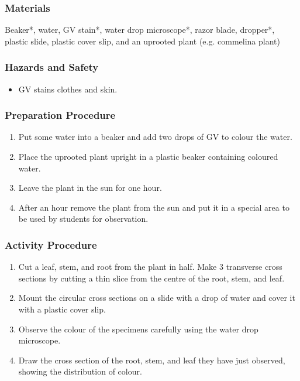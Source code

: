 \subsubsection*{Materials}
Beaker*, water, GV stain*, water drop microscope*, razor blade, dropper*, plastic slide, plastic cover slip, and an uprooted plant (e.g. commelina plant)

\subsubsection*{Hazards and Safety}
\begin{itemize}
\item{GV stains clothes and skin.}
\end{itemize}

\subsubsection*{Preparation Procedure}
\begin{enumerate}
\item{Put some water into a beaker and add two drops of GV to colour the water.}
\item{Place the uprooted plant upright in a plastic beaker containing coloured water.}
\item{Leave the plant in the sun for one hour.}
\item{After an hour remove the plant from the sun and put it in a special area to be used by students for observation.}
\end{enumerate}

\subsubsection*{Activity Procedure}
\begin{enumerate}
\item{Cut a leaf, stem, and root from the plant in half. Make 3 transverse cross sections by cutting a thin slice from the centre of the root, stem, and leaf.}
\item{Mount the circular cross sections on a slide with a drop of water and cover it with a plastic cover slip.}
\item{Observe the colour of the specimens carefully using the water drop microscope.}
\item{Draw the cross section of the root, stem, and leaf they have just observed, showing the distribution of colour.}
\end{enumerate}

